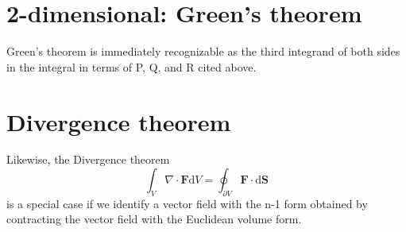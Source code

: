 \documentclass[a4paper]{article}
\begin{document}
\section{2-dimensional: Green's theorem}
Green's theorem is immediately recognizable as the third integrand of both sides in the integral in terms of P, Q, and R cited above.
\section{Divergence theorem}
Likewise, the Divergence theorem 
\begin{equation}
\int_V \nabla\cdot\boldsymbol{F} \mathrm{d}V=\oint_{\partial V} \boldsymbol{F}\cdot \mathrm{d}\boldsymbol{S}
\end{equation}
is a special case if we identify a vector field with the n-1 form obtained by contracting the vector field with the Euclidean volume form.
\end{document}
